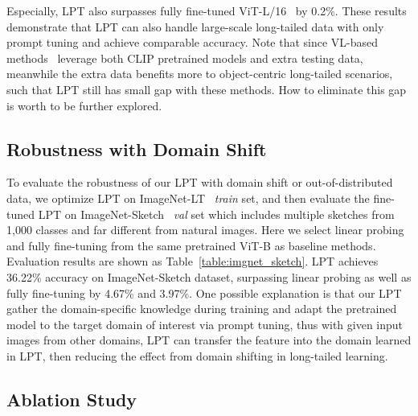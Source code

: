 \documentclass{article} \usepackage{iclr2023_conference,times}
\begin{document}
Especially, LPT also surpasses fully fine-tuned ViT-L/16~\citep{touvron2022things} by 0.2\%. These results demonstrate that LPT can also handle large-scale long-tailed data with only prompt tuning and achieve comparable accuracy. 
Note that since VL-based methods~\citep{tian2021vl,Long2022} leverage both CLIP pretrained models and extra testing data, meanwhile the extra data benefits more to object-centric long-tailed scenarios, such that LPT still has small gap with these methods. How to eliminate this gap is worth to be further explored. 


\vspace{-0.5em}
\subsection{Robustness with Domain Shift}\label{sec:gene_domainshift}
To evaluate the robustness of our LPT with domain shift or out-of-distributed data, we optimize LPT on ImageNet-LT~\citep{deng2009imagenet,openlongtailrecognition} \textit{train} set, and then evaluate the fine-tuned LPT on ImageNet-Sketch~\citep{wang2019learning} \textit{val} set which includes multiple sketches from 1,000 classes and far different from natural images. Here we select linear probing and fully fine-tuning from the same pretrained ViT-B as baseline methods. Evaluation results are shown as Table~\ref{table:imgnet_sketch}. LPT achieves 36.22\% accuracy on ImageNet-Sketch dataset, surpassing linear probing as well as fully fine-tuning by 4.67\% and 3.97\%.
One possible explanation is that our LPT gather the domain-specific knowledge during training and adapt the pretrained model to the target domain of interest via prompt tuning, thus with given input images from other domains, LPT can transfer the feature into the domain learned in LPT, then reducing the effect from domain shifting in long-tailed learning.




\vspace{-0.5em}
\subsection{Ablation Study}\label{sec:ablation}
\vspace{-0.4em}
\end{document}
